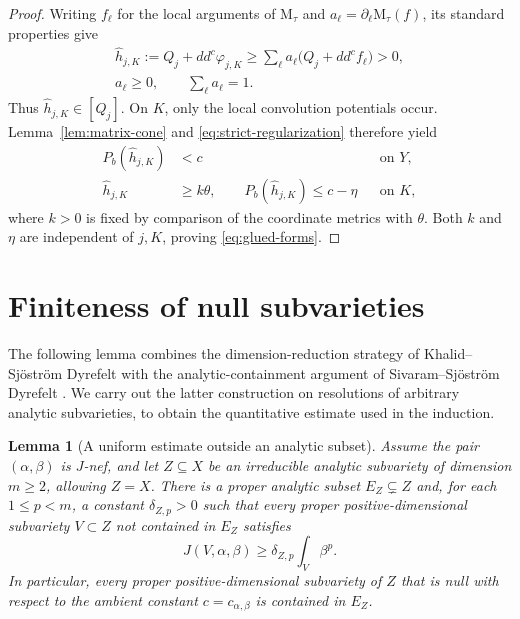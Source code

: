\documentclass[reqno]{amsart}
\theoremstyle{remark}
\newcommand{\cab}{c_{\alpha,\beta}}
\theoremstyle{plain}
\newtheorem{lemma}[thm]{Lemma}
\begin{document}
\begin{proof}
Writing \(f_\ell\) for the local arguments of \(\mathrm M_\tau\) and \(a_\ell=\partial_\ell\mathrm M_\tau(f)\), its standard properties give
\[
\begin{gathered}
\widehat h_{j,K}:=Q_j+dd^c\varphi_{j,K}
\ge\sum_\ell a_\ell\bigl(Q_j+dd^c f_\ell\bigr)>0,\\
a_\ell\ge0,\qquad\sum_\ell a_\ell=1.
\end{gathered}
\]
Thus \(\widehat h_{j,K}\in[Q_j]\). On \(K\), only the local convolution potentials occur. Lemma~\ref{lem:matrix-cone} and \eqref{eq:strict-regularization} therefore yield
\[
\begin{aligned}
P_b(\widehat h_{j,K})&<c&&\text{on }Y,\\
\widehat h_{j,K}&\ge k\theta,\qquad
P_b(\widehat h_{j,K})\le c-\eta&&\text{on }K,
\end{aligned}
\]
where \(k>0\) is fixed by comparison of the coordinate metrics with \(\theta\). Both \(k\) and \(\eta\) are independent of \(j,K\), proving \eqref{eq:glued-forms}.
\end{proof}







 



\section{Finiteness of null subvarieties}
The following lemma combines the dimension-reduction strategy of Khalid--Sj\"ostr\"om Dyrefelt \cite[proofs of Theorems 3.1 and 3.9]{KSD26} with the analytic-containment argument of Sivaram--Sj\"ostr\"om Dyrefelt \cite[Proposition 4.3 and its proof, equations (4.10)--(4.11)]{SSD26}. We carry out the latter construction on resolutions of arbitrary analytic subvarieties, to obtain the quantitative estimate used in the induction.
\begin{lemma}[A uniform estimate outside an analytic subset]\label{lem:local-gap}
Assume the pair $(\alpha,\beta)$ is $J$-nef, and let \(Z\subseteq X\) be an irreducible analytic subvariety of dimension \(m\ge2\), allowing \(Z=X\). There is a proper analytic subset \(E_Z\subsetneq Z\) and, for each \(1\le p<m\), a constant \(\delta_{Z,p}>0\) such that every proper positive-dimensional subvariety \(V\subset Z\) not contained in \(E_Z\) satisfies
\begin{equation}\label{eq:local-gap}
J(V,\alpha,\beta)\ge\delta_{Z,p}\int_V\beta^p.
\end{equation}
In particular, every proper positive-dimensional subvariety of $Z$ that is null with respect to the ambient constant $c=\cab$ is contained in \(E_Z\).
\end{lemma}
\end{document}
